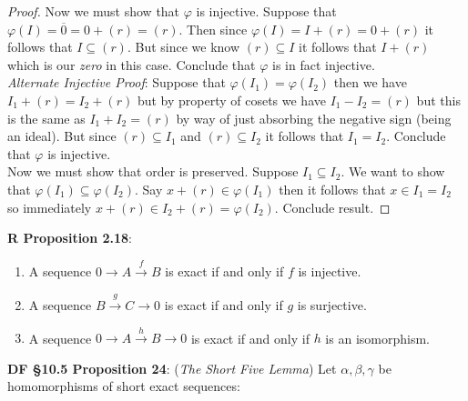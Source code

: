 \documentclass[8pt]{amsart}
\theoremstyle{plain}%
\theoremstyle{definition}
\theoremstyle{remark}
\numberwithin{equation}{section}
\begin{document}
\begin{proof}
		Now we must show that $\varphi$ is injective. Suppose that $\varphi(I) = \overline 0 = 0 + (r) = (r)$. Then since $\varphi(I) = I + (r) = 0 + (r)$ it follows that $I \subseteq (r)$. But since we know $(r) \subseteq I$ it follows that $I + (r)$ which is our \textit{zero} in this case. Conclude that $\varphi$ is in fact injective.\\

		\textit{Alternate Injective Proof}: Suppose that $\varphi(I_1) = \varphi(I_2)$ then we have $I_1 + (r) = I_2 + (r)$ but by property of cosets we have $I_1 - I_2 = (r)$ but this is the same as $I_1 + I_2 = (r)$ by way of just absorbing the negative sign (being an ideal). But since $(r) \subseteq I_1$ and $(r) \subseteq I_2$ it follows that $I_1 = I_2$. Conclude that $\varphi$ is injective.\\

		Now we must show that order is preserved. Suppose $I_1 \subseteq I_2$. We want to show that $\varphi(I_1) \subseteq \varphi(I_2)$. Say $x + (r) \in \varphi(I_1)$ then it follows that $x \in I_1 = I_2$ so immediately $x + (r) \in I_2 + (r) = \varphi(I_2)$. Conclude result.

	\end{proof}

\textbf{R Proposition 2.18}:
	\begin{enumerate}
		\item A sequence $0 \rightarrow A \xrightarrow{f} B$ is exact if and only if $f$ is injective.
		\item A sequence $B \xrightarrow g C \rightarrow 0$ is exact if and only if $g$ is surjective.
		\item A sequence $0 \rightarrow A \xrightarrow{h} B \rightarrow 0$ is exact if and only if $h$ is an isomorphism.
	\end{enumerate}

\textbf{DF \S10.5 Proposition 24}: (\textit{The Short Five Lemma}) Let $\alpha, \beta, \gamma$ be homomorphisms of short exact sequences:\\

	\begin{center}
	\end{center}
\end{document}
